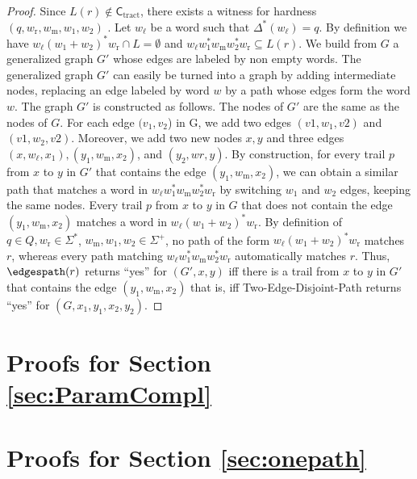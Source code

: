 \documentclass[a4paper,english]{lipics-v2016}
\newcommand{\ctract}{\ensuremath{\textsf{C}_\text{tract}}\xspace}
\theoremstyle{plain}
\begin{document}
\begin{proof}
	Since $L(r) \notin \ctract$, there exists a witness for
        hardness $(q, w_\text{r}, w_\text{m},w_1,w_2)$ \cite[Lemma
        1]{bagan}. Let $w_\ell$ be a word such that
        $\Delta^*(w_\ell) = q$.  By definition we have
	$w_\ell(w_1 + w_2)^*w_\text{r} \cap L = \emptyset$  and $w_\ell w_1^*w_\text{m}w_2^*w_\text{r} \subseteq L(r)$. 	
	We build from $G$ a generalized graph $G'$ whose edges are
        labeled by non empty words. The generalized graph $G'$ can
        easily be turned into a graph by adding intermediate nodes,
        replacing an edge labeled by word $w$ by a path whose edges form the word $w$.
	The graph $G'$ is constructed as follows. The nodes of $G'$ are the same as the nodes of $G$. For each edge $(v_1,v_2$) in G, we add two edges $(v1, w_1, v2)$ and $(v1, w_2, v2)$. Moreover, we add two new nodes $x, y$ and three edges $(x, w_\ell, x_1), (y_1, w_\text{m}, x_2)$, and $(y_2,wr,y)$.
	By construction, for every trail $p$ from $x$ to $y$ in $G'$
        that contains the edge $(y_1 , w_\text{m} , x_2 )$, we can
        obtain a similar path that matches a word in $w_\ell
        w_1^*w_\text{m}w_2^*w_\text{r}$ by switching $w_1$ and $w_2$
        edges, keeping the same nodes. Every trail $p$ from $x$ to $y$
        in $G$ that does not contain the edge $(y_1,w_\text{m},x_2)$
        matches a word in $w_\ell(w_1 + w_2)^*w_\text{r}$. By
        definition of $q \in Q, w_\text{r} \in \Sigma^*$,
        $w_\text{m},w_1,w_2 \in \Sigma^+$, no path of the form
        $w_\ell(w_1 + w_2)^*w_\text{r}$ matches $r$, whereas every
        path matching $w_\ell w_1^*w_\text{m}w_2^*w_\text{r}$
        automatically matches $r$. Thus, $\edgespath(r)$ returns
        ``yes'' for $(G',x,y)$ iff there is a trail from $x$ to $y$ in
        $G'$ that contains the edge $(y_1 , w_\text{m} , x_2 )$ that
        is, iff Two-Edge-Disjoint-Path returns ``yes'' for $(G,x_1,
        y_1,x_2,y_2)$. 
\end{proof}


 
\makeatletter{}
\section{Proofs for Section \ref{sec:ParamCompl}}\label{app:paramcompl}

\section*{Proofs for Section \ref{sec:onepath}}
\end{document}
